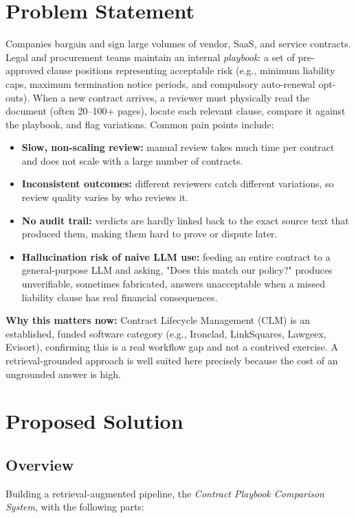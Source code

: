 \documentclass[11pt]{article}
\newcommand{\secx}[1]{\section{#1}}
\newcommand{\subsecx}[1]{\subsection{#1}}
\begin{document}
\secx{Problem Statement}
Companies bargain and sign large volumes of vendor, SaaS, and service contracts.
Legal and procurement teams maintain an internal \emph{playbook}: a set of pre-approved
clause positions representing acceptable risk (e.g., minimum liability caps, maximum
termination notice periods, and compulsory auto-renewal opt-outs). When a new contract
arrives, a reviewer must physically read the document (often 20--100+ pages), locate each
relevant clause, compare it against the playbook, and flag variations. Common pain points include:

\begin{itemize}
  \item \textbf{Slow, non-scaling review:} manual review takes much time per contract and
  does not scale with a large number of contracts.
  \item \textbf{Inconsistent outcomes:} different reviewers catch different variations,
  so review quality varies by who reviews it.
  \item \textbf{No audit trail:} verdicts are hardly linked back to the exact source
  text that produced them, making them hard to prove or dispute later.
  \item \textbf{Hallucination risk of naive LLM use:} feeding an entire contract to a
  general-purpose LLM and asking, "Does this match our policy?" produces
  unverifiable, sometimes fabricated, answers  unacceptable when a missed
  liability clause has real financial consequences.
\end{itemize}

\noindent\textbf{Why this matters now:} Contract Lifecycle
Management (CLM) is an established, funded software category (e.g., Ironclad,
LinkSquares, Lawgeex, Evisort), confirming this is a real workflow gap and not a
contrived exercise. A retrieval-grounded approach is well suited here precisely because
the cost of an ungrounded answer is high.

\secx{Proposed Solution}

\subsecx{Overview}


Building a retrieval-augmented pipeline, the \emph{Contract Playbook Comparison System},
with the following parts:
\end{document}
